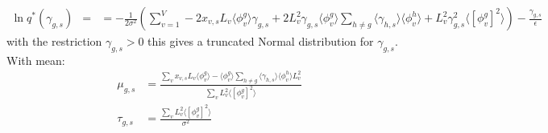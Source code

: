 \documentclass[10pt]{article}
\begin{document}
\begin{align}
\ln q^*(\gamma_{g,s}) & = 
& =  - \frac{1}{2\sigma^2} \left ( \sum_{v=1}^V -2 x_{v,s} L_v \langle \phi^g_{v} \rangle \gamma_{g,s}  
+ 2 L_v^2 \gamma_{g,s} \langle \phi_v^g \rangle \sum_{h \neq g } \langle \gamma_{h,s} \rangle \langle \phi^h_{v} \rangle
+ L_v^2 \gamma_{g,s}^2 \langle [\phi^g_{v}]^2  \rangle
\right)
- \frac{\gamma_{g,s}}{\epsilon}
\end{align}
with the restriction $\gamma_{g,s} > 0$ this gives a truncated Normal distribution for $\gamma_{g,s}$.
With mean:
\begin{align}
\mu_{g,s}  & = \frac{\sum_v x_{v,s} L_v \langle \phi_v^g \rangle  - \langle \phi_v^g \rangle \sum_{h \neq g} \langle \gamma_{h,s} \rangle \langle \phi^h_v\rangle L_v^2}{\sum_{v} L_v^2  \langle [\phi^g_{v}]^2  \rangle} \\
\tau_{g,s} & = \frac{\sum_{v} L_v^2  \langle [\phi^g_{v}]^2  \rangle}{\sigma^2} \\
\end{align}
\end{document}
